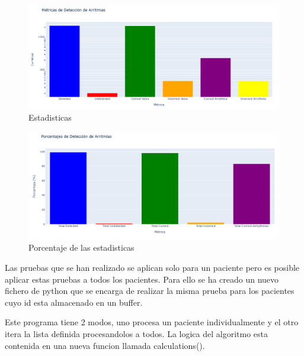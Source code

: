 \begin{figure}[h!]
	\centering
    \includegraphics[width=0.99\textwidth]{./Images/img_algoritmo/estadisticas_arritmias_1.png}
    \caption{Estadisticas}
    \label{fig:estadisticas_algoritmos_1}
\end{figure} 

\begin{figure}[h!]
	\centering
    \includegraphics[width=0.99\textwidth]{./Images/img_algoritmo/estadisticas_arritmias_2.png}
    \caption{Porcentaje de las estadisticas}
    \label{fig:estadisticas_algoritmos_2}
\end{figure} 


Las pruebas que se han realizado se aplican solo para un paciente pero es posible aplicar estas pruebas a todos los pacientes.
Para ello se ha creado un nuevo fichero de python que se encarga de realizar la misma prueba para los pacientes cuyo id esta
almacenado en un buffer.

Este programa tiene 2 modos, uno procesa un paciente individualmente y el otro itera la lista definida procesandolos a todos. La
logica del algoritmo esta contenida en una nueva funcion llamada calculations().

